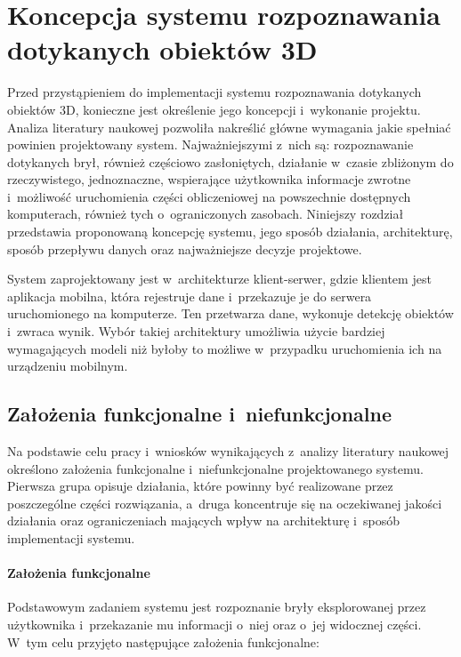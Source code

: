 \chapter{Koncepcja systemu rozpoznawania dotykanych obiektów 3D}
\label{c:koncepcja}

Przed przystąpieniem do implementacji systemu rozpoznawania dotykanych obiektów 3D, konieczne jest określenie jego koncepcji i~wykonanie projektu. Analiza literatury naukowej pozwoliła nakreślić główne wymagania jakie spełniać powinien projektowany system. Najważniejszymi z~nich są: rozpoznawanie dotykanych brył, również częściowo zasłoniętych, działanie w~czasie zbliżonym do rzeczywistego, jednoznaczne, wspierające użytkownika informacje zwrotne i~możliwość uruchomienia części obliczeniowej na powszechnie dostępnych komputerach, również tych o~ograniczonych zasobach. Niniejszy rozdział przedstawia proponowaną koncepcję systemu, jego sposób działania, architekturę, sposób przepływu danych oraz najważniejsze decyzje projektowe.

System zaprojektowany jest w~architekturze klient-serwer, gdzie klientem jest aplikacja mobilna, która rejestruje dane i~przekazuje je do serwera uruchomionego na komputerze. Ten przetwarza dane, wykonuje detekcję obiektów i~zwraca wynik. Wybór takiej architektury umożliwia użycie bardziej wymagających modeli niż byłoby to możliwe w~przypadku uruchomienia ich na urządzeniu mobilnym.

\section{Założenia funkcjonalne i~niefunkcjonalne}
\label{sec:założenia}

Na podstawie celu pracy i~wniosków wynikających z~analizy literatury naukowej określono założenia funkcjonalne i~niefunkcjonalne projektowanego systemu. Pierwsza grupa opisuje działania, które powinny być realizowane przez poszczególne części rozwiązania, a~druga koncentruje się na oczekiwanej jakości działania oraz ograniczeniach mających wpływ na architekturę i~sposób implementacji systemu.

\subsubsection{Założenia funkcjonalne}
\label{ssec:założenia-funkcjonalne}

Podstawowym zadaniem systemu jest rozpoznanie bryły eksplorowanej przez użytkownika i~przekazanie mu informacji o~niej oraz o~jej widocznej części. W~tym celu przyjęto następujące założenia funkcjonalne:

